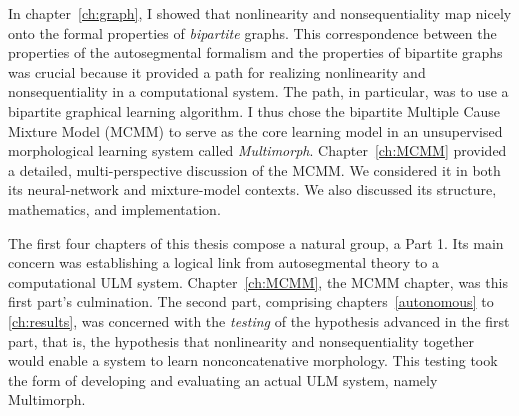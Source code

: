 In chapter~\ref{ch:graph}, I showed that nonlinearity 
and nonsequentiality map nicely onto the formal properties of \emph{bipartite} graphs.
This correspondence between the properties of the autosegmental formalism and the properties of bipartite graphs was crucial because it provided a path for realizing nonlinearity 
and nonsequentiality in a computational system. The path, in particular, was to use a bipartite graphical learning algorithm. I thus chose the bipartite Multiple Cause Mixture Model (MCMM) \citep{saund:94} to serve as the core learning model in an unsupervised morphological learning system called \emph{Multimorph}. Chapter~\ref{ch:MCMM} provided a detailed, multi-perspective discussion of the MCMM. We considered it  in both
its neural-network and mixture-model contexts. We also discussed its structure, mathematics, and implementation.

The first four chapters of this thesis compose a natural group, a Part 1. Its main concern was
 establishing a logical link from autosegmental theory to a computational ULM system. Chapter~\ref{ch:MCMM}, the MCMM chapter,
 was this first part's culmination. 
The second part, %
comprising chapters~\ref{autonomous} to \ref{ch:results}, was concerned with the \emph{testing} of the hypothesis advanced in the first part, that is, the hypothesis that nonlinearity and nonsequentiality together would enable a system to learn nonconcatenative morphology.
This testing took the form of developing and evaluating an actual ULM system, namely Multimorph. 

